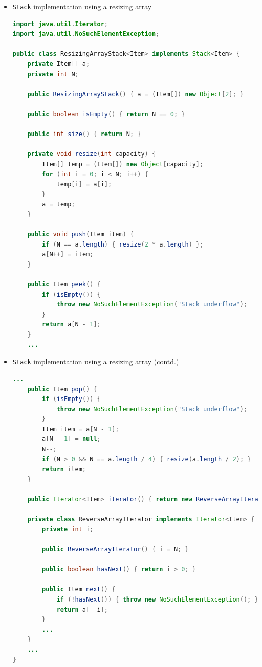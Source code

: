 \documentclass[8pt,a4paper,compress]{beamer}
\begin{document}
\begin{frame}[fragile]
\begin{itemize}
\item \lstinline{Stack} implementation using a resizing array
\begin{lstlisting}[language=Java]
import java.util.Iterator;
import java.util.NoSuchElementException;

public class ResizingArrayStack<Item> implements Stack<Item> {
    private Item[] a; 
    private int N; 

    public ResizingArrayStack() { a = (Item[]) new Object[2]; }

    public boolean isEmpty() { return N == 0; }

    public int size() { return N; }

    private void resize(int capacity) {
        Item[] temp = (Item[]) new Object[capacity];
        for (int i = 0; i < N; i++) {
            temp[i] = a[i];
        }
        a = temp;
    }

    public void push(Item item) {
        if (N == a.length) { resize(2 * a.length) }; 
        a[N++] = item; 
    }

    public Item peek() {
        if (isEmpty()) {
            throw new NoSuchElementException("Stack underflow");
        }
        return a[N - 1];
    }    
    ...
\end{lstlisting}
\end{itemize}
\end{frame}

\begin{frame}[fragile]
\begin{itemize}
\item \lstinline{Stack} implementation using a resizing array (contd.)
\begin{lstlisting}[language=Java]
    ...    
    public Item pop() {
        if (isEmpty()) { 
            throw new NoSuchElementException("Stack underflow"); 
        }
        Item item = a[N - 1];
        a[N - 1] = null; 
        N--;
        if (N > 0 && N == a.length / 4) { resize(a.length / 2); }
        return item;
    }

    public Iterator<Item> iterator() { return new ReverseArrayIterator(); }

    private class ReverseArrayIterator implements Iterator<Item> {
        private int i;

        public ReverseArrayIterator() { i = N; }

        public boolean hasNext() { return i > 0; }

        public Item next() {
            if (!hasNext()) { throw new NoSuchElementException(); }
            return a[--i];
        }
        ...
    }
    ...
}
\end{lstlisting}
\end{itemize}
\end{frame}
\end{document}
